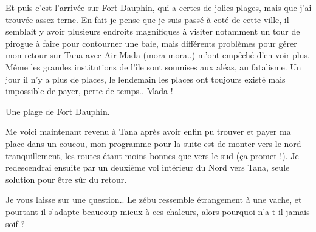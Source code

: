 \begin{multicols}{2}

Et puis c'est l'arrivée sur Fort Dauphin, qui a certes de jolies plages, mais que j'ai trouvée assez terne. En fait je pense que je suis passé à coté de cette ville, il semblait y avoir plusieurs endroits magnifiques à visiter notamment un tour de pirogue à faire pour contourner une baie, mais différents problèmes pour gérer mon retour sur Tana avec Air Mada (mora mora..) m'ont empêché d'en voir plus. Même les grandes institutions de l'île sont soumises aux aléas, au fatalisme. Un jour il n'y a plus de places, le lendemain les places ont toujours existé mais impossible de payer, perte de temps.. Mada !

Une plage de Fort Dauphin.


Me voici maintenant revenu à Tana après avoir enfin pu trouver et payer ma place dans un coucou, mon programme pour la suite est de monter vers le nord tranquillement, les routes étant moins bonnes que vers le sud (ça promet !). Je redescendrai ensuite par un deuxième vol intérieur du Nord vers Tana, seule solution pour être sûr du retour.

Je vous laisse sur une question.. Le zébu ressemble étrangement à une vache, et pourtant il s'adapte beaucoup mieux à ces chaleurs, alors pourquoi n'a t-il jamais soif ?

\end{multicols}
